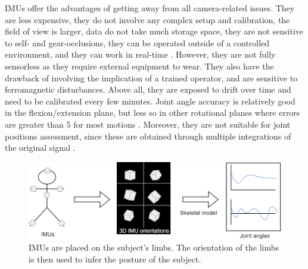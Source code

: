 IMUs offer the advantages of getting away from all camera-related issues. They are less expensive, they do not involve any complex setup and calibration, the field of view is larger, data do not take much storage space, they are not sensitive to self- and gear-occlusions, they can be operated outside of a controlled environment, and they can work in real-time \cite{Johnston2019,Chambers2015}. However, they are not fully sensorless as they require external equipment to wear. They also have the drawback of involving the implication of a trained operator, and are sensitive to ferromagnetic disturbances. Above all, they are exposed to drift over time and need to be calibrated every few minutes. Joint angle accuracy is relatively good in the flexion/extension plane, but less so in other rotational planes where errors are greater than 5\degree{} for most motions \cite{Zhang2013, Rekant2022}. Moreover, they are not suitable for joint positions assessment, since these are obtained through multiple integrations of the original signal \cite{Ahmad2013}. 

\begin{figure}[hbtp]
	\centering
	\def\svgwidth{1\columnwidth}
	\fontsize{10pt}{10pt}\selectfont
	\includegraphics[width=0.85\linewidth]{"../Chap1/Figures/Fig_IMUs.png"}
	\caption{IMUs are placed on the subject's limbs. The orientation of the limbs is then used to infer the posture of the subject.}
	\label{fig_imus}
\end{figure}
\FloatBarrier


